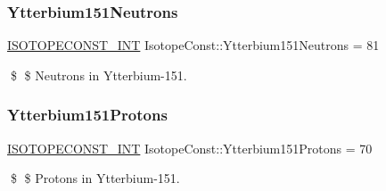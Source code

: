 \subsubsection{\texorpdfstring{Ytterbium151\+Neutrons}{Ytterbium151Neutrons}}
{\footnotesize\ttfamily \mbox{\hyperlink{group___isotope_const-_macros_ga5f18360b3e99483a35c32d789e62621c}{I\+S\+O\+T\+O\+P\+E\+C\+O\+N\+S\+T\+\_\+\+I\+NT}} Isotope\+Const\+::\+Ytterbium151\+Neutrons = 81}

\$ \$ Neutrons in Ytterbium-\/151. \mbox{\label{group___isotope_const-_ytterbium-_yb151_ga2d49697ecb80c98a6af5af83e5f42b53}} 
\subsubsection{\texorpdfstring{Ytterbium151\+Protons}{Ytterbium151Protons}}
{\footnotesize\ttfamily \mbox{\hyperlink{group___isotope_const-_macros_ga5f18360b3e99483a35c32d789e62621c}{I\+S\+O\+T\+O\+P\+E\+C\+O\+N\+S\+T\+\_\+\+I\+NT}} Isotope\+Const\+::\+Ytterbium151\+Protons = 70}

\$ \$ Protons in Ytterbium-\/151. 